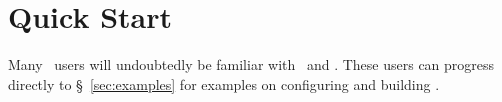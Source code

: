 
\section{Quick Start}
\label{sec:quick}

Many \draco\ users will undoubtedly be familiar with \autoconf\ and
\gmake. These users can progress directly to \S~\ref{sec:examples} for 
examples on configuring and building \draco. 

